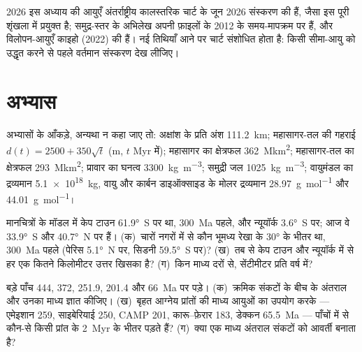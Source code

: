 \begin{dated}{2026}
इस अध्याय की आयुएँ अंतर्राष्ट्रीय कालस्तरिक चार्ट के जून 2026 संस्करण की हैं,
जैसा इस पूरी शृंखला में प्रयुक्त है; समुद्र-स्तर के अभिलेख अपनी फ़ाइलों के 2012 के समय-मापक्रम
पर हैं, और विलोपन-आयुएँ काइहो (2022) की हैं। नई तिथियाँ आने पर चार्ट संशोधित होता है:
किसी सीमा-आयु को उद्धृत करने से पहले वर्तमान संस्करण देख लीजिए।
\end{dated}

\section*{अभ्यास}\label{sec:b2:phanerozoic-earth:exercises}

अभ्यासों के आँकड़े, अन्यथा न कहा जाए तो: अक्षांश के प्रति अंश \qty{111.2}{km}; महासागर-तल
की गहराई $d(t) = 2500 + 350\sqrt t$ (\unit{m}, $t$ \unit{Myr} में); महासागर का क्षेत्रफल
\qty{362}{\mega km^2}; महासागर-तल का क्षेत्रफल \qty{293}{\mega km^2}; प्रावार का घनत्व
\qty{3300}{kg.m^{-3}}; समुद्री जल \qty{1025}{kg.m^{-3}}; वायुमंडल का द्रव्यमान
\qty{5.1e18}{kg}, वायु और कार्बन डाइऑक्साइड के मोलर द्रव्यमान \qty{28.97}{g.mol^{-1}} और
\qty{44.01}{g.mol^{-1}}।

\begin{exercise}[$\star$]\label{exo:b2:phanerozoic-earth:1}
मानचित्रों के मॉडल में केप टाउन \ang{61.9}~S पर था, \qty{300}{Ma} पहले, और न्यूयॉर्क
\ang{3.6}~S पर; आज वे \ang{33.9}~S और \ang{40.7}~N पर हैं। (क)~चारों नगरों में से कौन भूमध्य रेखा के
\ang{30} के भीतर था, \qty{300}{Ma} पहले (पेरिस \ang{5.1}~N पर, सिडनी
\ang{59.5}~S पर)? (ख)~तब से केप टाउन और न्यूयॉर्क में से हर एक कितने किलोमीटर उत्तर खिसका है?
(ग)~किन माध्य दरों से, सेंटीमीटर प्रति वर्ष में?
\end{exercise}

\begin{exercise}[$\star$]\label{exo:b2:phanerozoic-earth:2}
बड़े पाँच 444, 372, 251.9, 201.4 और \qty{66}{Ma} पर पड़े। (क)~क्रमिक संकटों के बीच के
अंतराल और उनका माध्य ज्ञात कीजिए। (ख)~बृहत आग्नेय प्रांतों की माध्य आयुओं का उपयोग करके ---
एमेइशान 259, साइबेरियाई 250, CAMP 201, कारू--फ़ेरार 183, डेक्कन \qty{65.5}{Ma} --- पाँचों में से
कौन-से किसी प्रांत के \qty{2}{Myr} के भीतर पड़ते हैं? (ग)~क्या एक माध्य अंतराल संकटों को आवर्ती बनाता है?
\end{exercise}

